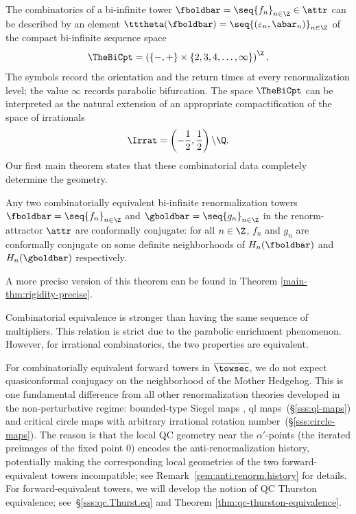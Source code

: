 \documentclass{amsart}
\begin{document}
The combinatorics of a bi-infinite tower $\fboldbar = \seq{f_n}_{n\in \Z} \in \attr$ can be described by an element $\tttheta(\fboldbar) = \seq{ (\varepsilon_n, \abar_n) }_{n \in \Z}$ of the compact bi-infinite sequence space 
    \[
        \TheBiCpt = 
        \left( \{-,+\} \times \{2,3,4,\ldots,\infty\} 
        \right)^{\Z}.
    \]
The symbols record the orientation and the return times at every renormalization level; the value $\infty$ records parabolic bifurcation.
The space $\TheBiCpt$ can be interpreted as the natural extension of an appropriate compactification of the space of irrationals 
\[
    \Irrat = \left( -\frac{1}{2},\frac{1}{2} \right) \backslash \Q.
\]
Our first main theorem states that these combinatorial data completely determine the geometry.

\begin{thmx}
    \label{main-thm:rigidity}
    Any two combinatorially equivalent bi-infinite renormalization towers $\fboldbar = \seq{f_n}_{n \in \Z}$ and $\gboldbar = \seq{g_n}_{n \in \Z}$ in the renorm-attractor $\attr$ are conformally conjugate: for all $n \in \Z$, $f_n$ and $g_n$ are conformally conjugate on some definite neighborhoods of $H_n(\fboldbar)$ and $H_n(\gboldbar)$ respectively. 
\end{thmx}

A more precise version of this theorem can be found in Theorem \ref{main-thm:rigidity-precise}.

\begin{remark}\label{rem:comb.eq vs mult}
    Combinatorial equivalence is stronger than having the same sequence of multipliers.
    This relation is strict due to the parabolic enrichment phenomenon.
    However, for irrational combinatorics, the two properties are equivalent.
\end{remark}


\begin{remark}\label{rem:intro.forw.towers}
    For combinatorially equivalent forward towers in $\overline{\towsec}$, we do not expect quasiconformal conjugacy on the neighborhood of the Mother Hedgehog. This is one fundamental difference from all other renormalization theories developed in the non-perturbative regime: bounded-type Siegel maps \cite{McM98,AL22}, ql maps~(\S\ref{sss:ql-maps}) and critical circle maps with arbitrary irrational rotation number~(\S\ref{sss:circle-maps}). The reason is that the local QC geometry near the $\alpha'$-points (the iterated preimages of the fixed point $0$) encodes the anti-renormalization history, potentially making the corresponding local geometries of the two forward-equivalent towers incompatible; see Remark~\ref{rem:anti.renorm.history} for details. For forward-equivalent towers, we will develop the notion of QC Thurston equivalence; see~\S\ref{sss:qc.Thurst.eq} and Theorem \ref{thm:qc-thurston-equivalence}.
\end{remark}
\end{document}
